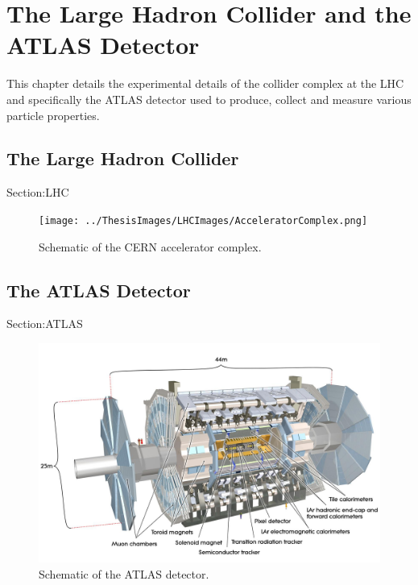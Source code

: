 
\chapter{The Large Hadron Collider and the ATLAS Detector}
\label{ch:LHCDetector}

This chapter details the experimental details of the collider complex at the LHC and specifically the ATLAS detector used to produce, collect and measure various particle properties.
\section{The Large Hadron Collider}
Section:LHC

\begin{figure}[h!]
	\centering
	\texttt{[image: ../ThesisImages/LHCImages/AcceleratorComplex.png]}
	\caption{Schematic of the CERN accelerator complex.\cite{LHCAccComplex}
	}
	\label{fig:AcceleratorMap}
\end{figure}



\section{The ATLAS Detector}
Section:ATLAS
\begin{figure}[h!]
	\centering
	\includegraphics[width=\columnwidth]{../ThesisImages/LHCImages/AtlasDetector.png}
	\caption{Schematic of the ATLAS detector.\cite{ATLAS}
	}
	\label{fig:ATLASOverview}
\end{figure}

